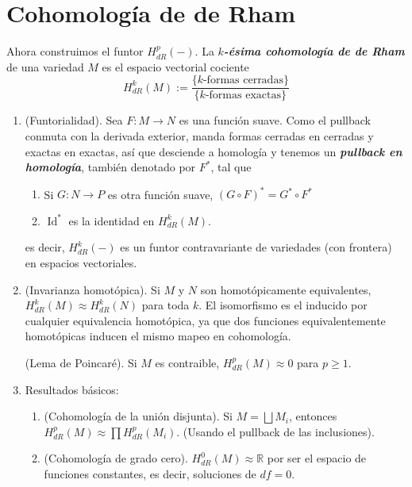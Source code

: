 \documentclass[spanish]{article}
\theoremstyle{definition}
\newcommand{\R}{\mathbb{R}}
\DeclareMathOperator{\Id}{Id}
\begin{document}
	\section{Cohomología de de Rham}\label{sec:3}
	Ahora construimos el funtor $H_{dR}^p(-)$. La \textbf{\textit{$k$-ésima cohomología de de Rham}} de una variedad $M$ es el espacio vectorial cociente
	\[H_{dR}^k(M):=\frac{\{k\text{-formas cerradas}\}}{\{k\text{-formas exactas}\}}\]
	\begin{enumerate}		
		\item (Funtorialidad). Sea  $F:M\to N$ es una función suave. Como el pullback 
		conmuta con la derivada exterior, manda formas cerradas en cerradas y exactas en exactas, así que desciende a homología y tenemos un \textbf{\textit{pullback en homología}}, también denotado por $F^*$, tal que
		\begin{enumerate}
			\item Si $G:N\to P$ es otra función suave, $(G\circ F)^*=G^*\circ F^*$
			\item $\Id^*$ es la identidad en $H_{dR}^k(M)$.
		\end{enumerate}
		es decir, $H_{dR}^k(-)$ es un funtor contravariante de variedades (con frontera) en espacios vectoriales.
		
		\item (Invarianza homotópica). Si $M$ y $N$ son homotópicamente equivalentes, $H_{dR}^k(M)\approx H_{dR}^k(N)$ para toda $k$. El isomorfismo es el inducido por cualquier equivalencia homotópica, ya que dos funciones equivalentemente homotópicas inducen el mismo mapeo en cohomología.
		
		(Lema de Poincaré). Si $M$ es contraible, $H_{dR}^p(M)\approx0$ para $p\geq1$.
		
		\item Resultados básicos:
		\begin{enumerate}
			\item (Cohomología de la unión disjunta). Si $M=\bigsqcup M_i$, entonces $H_{dR}^p(M)\approx \prod H_{dR}^p(M_i)$. (Usando el pullback de las inclusiones).
			
			\item (Cohomología de grado cero). $H_{dR}^0(M)\approx\R$ por ser el espacio de funciones constantes, es decir, soluciones de $df=0$.
			

\end{enumerate}
\end{enumerate}
\end{document}
